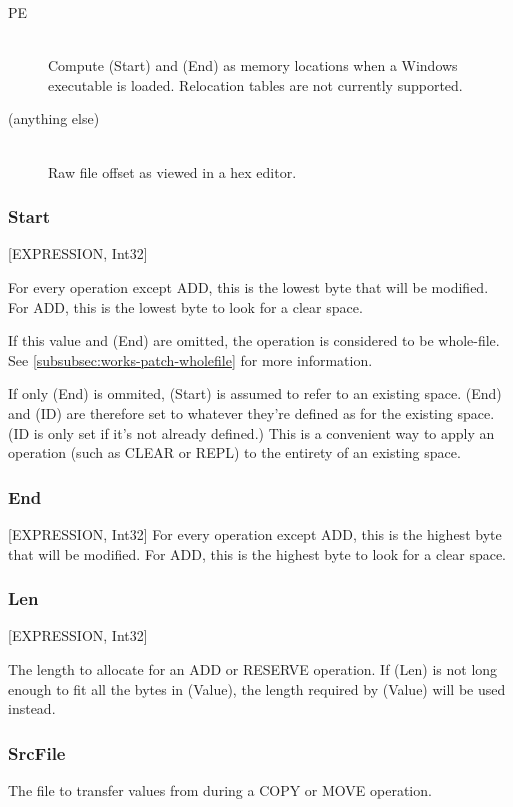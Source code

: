 \documentclass[12pt,a4paper,notitlepage]{article}
\begin{document}
\begin{description}
\item[PE] \hfill \\ 
    Compute (Start) and (End) as memory locations when a Windows executable is loaded. Relocation tables are not currently supported.
\item[(anything else)] \hfill \\
    Raw file offset as viewed in a hex editor.
\end{description}

\subsubsection{Start}
[EXPRESSION, Int32]

For every operation except ADD, this is the lowest byte that will be modified. For ADD, this is the lowest byte to look for a clear space.

If this value and (End) are omitted, the operation is considered to be whole-file. See \ref{subsubsec:works-patch-wholefile} for more information.

If only (End) is ommited, (Start) is assumed to refer to an existing space. (End) and (ID) are therefore set to whatever they're defined as for the existing space. (ID is only set if it's not already defined.) This is a convenient way to apply an operation (such as CLEAR or REPL) to the entirety of an existing space.

\subsubsection{End}
[EXPRESSION, Int32]
For every operation except ADD, this is the highest byte that will be modified. For ADD, this is the highest byte to look for a clear space.

\subsubsection{Len}
[EXPRESSION, Int32]

The length to allocate for an ADD or RESERVE operation. If (Len) is not long enough to fit all the bytes in (Value), the length required by (Value) will be used instead. 

\subsubsection{SrcFile}
The file to transfer values from during a COPY or MOVE operation.
\end{document}
